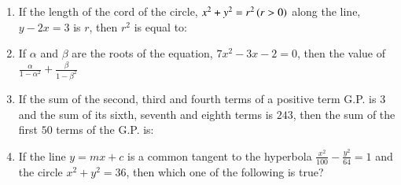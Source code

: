 \documentclass[journal,12pt,onecolumn]{IEEEtran}
\theoremstyle{remark}
\begin{document}
\begin{enumerate}
      \item If the length of the cord of the circle, $x^{2}+y^{2}=r^{2}\left(r>0\right)$ along the line, $y-2x=3$ is $r$, then $r^{2}$ is equal to:
      \begin{enumerate}
      \end{enumerate}
      \item If $\alpha$ and $\beta$ are the roots of the equation, $7x^{2}-3x-2=0$, then the value of$\frac{\alpha}{1-\alpha^{2}} +\frac{\beta}{1-\beta^{2}}$
      \begin{enumerate}
      \end{enumerate}
      \item If the sum of the second, third and fourth terms of a positive term G.P. is $3$ and the sum of its sixth, seventh and eighth terms is $243$, then the sum of the first $50$ terms of the G.P. is:
       \begin{enumerate}
      \end{enumerate}
     \item If the line $y=mx+c$ is a common tangent to the hyperbola $\frac{x^{2}}{100} - \frac{y^{2}}{64}=1$ and the circle $x^{2}+y^{2}=36$, then which one of the following is true?
      \begin{enumerate}
\end{enumerate}
\end{enumerate}
\end{document}
